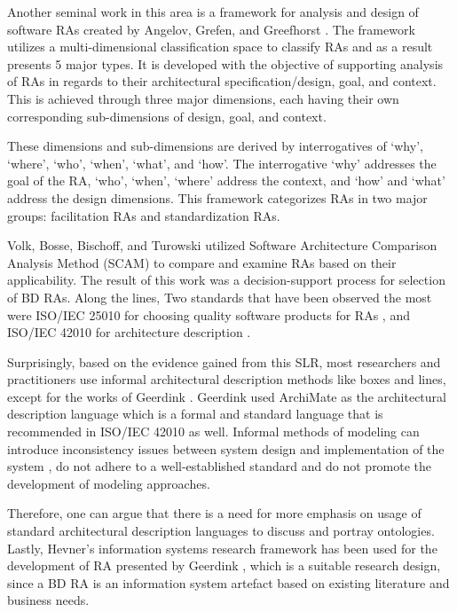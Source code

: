 \documentclass{ieeeaccess}
\begin{document}
Another seminal work in this area is a framework for analysis and design of software RAs created by Angelov, Grefen, and Greefhorst \cite{angelov2012framework}. The framework utilizes a multi-dimensional classification space to classify RAs and as a result presents 5 major types. It is developed with the objective of supporting analysis of RAs in regards to their architectural specification/design, goal, and context. This is achieved through three major dimensions, each having their own corresponding sub-dimensions of design, goal, and context. 

These dimensions and sub-dimensions are derived by interrogatives of ‘why’, ‘where’, ‘who’, ‘when’, ‘what’, and ‘how’. The interrogative ‘why’ addresses the goal of the RA, ‘who’, ‘when’, ‘where’ address the context, and ‘how’ and ‘what’ address the design dimensions. This framework categorizes RAs in two major groups: facilitation RAs and standardization RAs.

Volk, Bosse, Bischoff, and Turowski \cite{volk2019decision} utilized Software Architecture Comparison Analysis Method (SCAM) to compare and examine RAs based on their applicability. The result of this work was a decision-support process for selection of BD RAs. Along the lines, Two standards that have been observed the most were ISO/IEC 25010 for choosing quality software products for RAs \cite{Iso}, and ISO/IEC 42010 for architecture description \cite{ISO42010}. 

Surprisingly, based on the evidence gained from this SLR, most researchers and practitioners use informal architectural description methods like boxes and lines, except for the works of Geerdink \cite{geerdink2013reference}. Geerdink used ArchiMate \cite{josey2016introduction} as the architectural description language which is a formal and standard  language that is recommended in ISO/IEC 42010 as well. Informal methods of modeling can introduce inconsistency issues between system design and implementation of the system \cite{zhu2005software}, do not adhere to a well-established standard and do not promote the development of modeling approaches. 

Therefore, one can argue that there is a need for more emphasis on usage of standard architectural description languages to discuss and portray ontologies. Lastly, Hevner's information systems research framework \cite{hevner2004design} has been used for the development of RA presented by Geerdink \cite{geerdink2013reference}, which is a suitable research design, since a BD RA is an information system artefact based on existing literature and business needs. 
\end{document}
